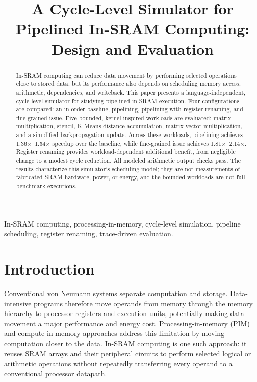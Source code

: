 \documentclass[conference]{IEEEtran}
\begin{document}
\title{A Cycle-Level Simulator for Pipelined In-SRAM Computing: Design and Evaluation}

\author{
}
\maketitle

\begin{abstract}
In-SRAM computing can reduce data movement by performing selected operations close to stored data, but its performance also depends on scheduling memory access, arithmetic, dependencies, and writeback. This paper presents a language-independent, cycle-level simulator for studying pipelined in-SRAM execution. Four configurations are compared: an in-order baseline, pipelining, pipelining with register renaming, and fine-grained issue. Five bounded, kernel-inspired workloads are evaluated: matrix multiplication, stencil, K-Means distance accumulation, matrix-vector multiplication, and a simplified backpropagation update. Across these workloads, pipelining achieves 1.36$\times$--1.54$\times$ speedup over the baseline, while fine-grained issue achieves 1.81$\times$--2.14$\times$. Register renaming provides workload-dependent additional benefit, from negligible change to a modest cycle reduction. All modeled arithmetic output checks pass. The results characterize this simulator's scheduling model; they are not measurements of fabricated SRAM hardware, power, or energy, and the bounded workloads are not full benchmark executions.
\end{abstract}

\begin{IEEEkeywords}
In-SRAM computing, processing-in-memory, cycle-level simulation, pipeline scheduling, register renaming, trace-driven evaluation.
\end{IEEEkeywords}

\section{Introduction}
Conventional von Neumann systems separate computation and storage. Data-intensive programs therefore move operands from memory through the memory hierarchy to processor registers and execution units, potentially making data movement a major performance and energy cost. Processing-in-memory (PIM) and compute-in-memory approaches address this limitation by moving computation closer to the data. In-SRAM computing is one such approach: it reuses SRAM arrays and their peripheral circuits to perform selected logical or arithmetic operations without repeatedly transferring every operand to a conventional processor datapath.
\end{document}
